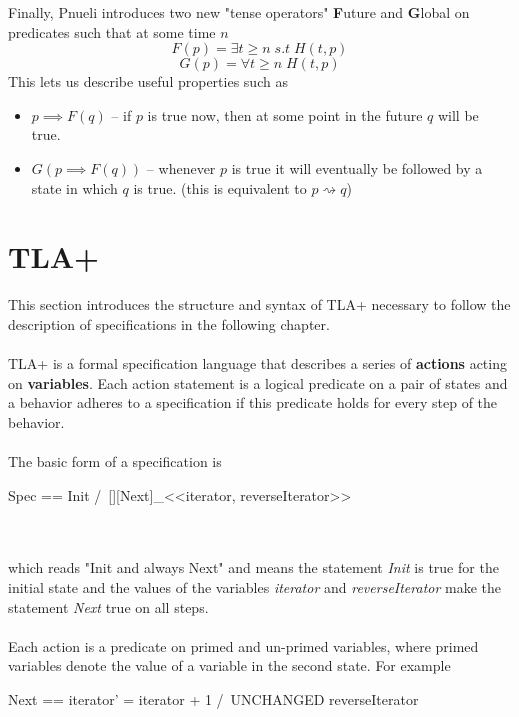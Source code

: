 \documentclass{uit-thesis}
\newcommand{\eventually}{\rightsquigarrow}
\begin{document}
Finally, Pnueli introduces two new "tense operators" \textbf{F}uture and \textbf{G}lobal on predicates such that at some time $n$
$$F(p) = \exists t \geq n \; s.t\; H(t,p)$$
$$G(p) = \forall t \geq n \; H(t,p)$$
This lets us describe useful properties such as
\begin{itemize}[label={}]
    \item $p \implies F(q)$ -- if $p$ is true now, then at some point in the future $q$ will be true.
    \item $G(p \implies F(q))$ -- whenever $p$ is true it will eventually be followed by a state in which $q$ is true. (this is equivalent to $p \eventually q$)     
\end{itemize}

\section{TLA+}\label{sec:TLA+}
This section introduces the structure and syntax of TLA+ necessary to follow the description of specifications in the following chapter.
\\\\
TLA+ is a formal specification language that describes a series of \textbf{actions} acting on \textbf{variables}. Each action statement is a logical predicate on a pair of states and a behavior adheres to a specification if this predicate holds for every step of the behavior.
\\\\
The basic form of a specification is
\begin{tla}
    Spec == Init /\ [][Next]_<<iterator, reverseIterator>>
\end{tla}
\begin{tlatex}
\end{tlatex}
\\\\
which reads "Init and always Next" and means the statement \textit{Init} is true for the initial state and the values of the variables \textit{iterator} and \textit{reverseIterator} make the statement \textit{Next} true on all steps.
\\\\
Each action is a predicate on primed and un-primed variables, where primed variables denote the value of a variable in the second state. For example
\begin{tla}
    Next == iterator' = iterator + 1 /\ UNCHANGED reverseIterator
\end{tla}
\end{document}
